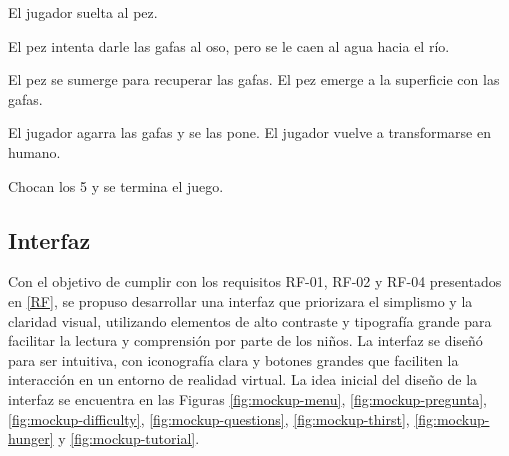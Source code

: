 \begin{play}

\begin{stage}
El jugador suelta al pez.
\end{stage}

\begin{stage}
El pez intenta darle las gafas al oso, pero se le caen al agua hacia el río.
\end{stage}




\begin{stage}
El pez se sumerge para recuperar las gafas.  
El pez emerge a la superficie con las gafas.
\end{stage}


\begin{stage}
El jugador agarra las gafas y se las pone.  
El jugador vuelve a transformarse en humano.
\end{stage}


\begin{stage}
Chocan los 5 y se termina el juego.
\end{stage}

\end{play}


\subsection{Interfaz}

Con el objetivo de cumplir con los requisitos RF-01, RF-02 y RF-04 presentados en \ref{RF}, se propuso desarrollar una interfaz que priorizara el simplismo y la claridad visual, utilizando elementos de alto contraste y tipografía grande para facilitar la lectura y comprensión por parte de los niños.
La interfaz se diseñó para ser intuitiva, con iconografía clara y botones grandes que faciliten la interacción en un entorno de realidad virtual. La idea inicial del diseño de la interfaz se encuentra en las Figuras \ref{fig:mockup-menu}, \ref{fig:mockup-pregunta}, \ref{fig:mockup-difficulty}, \ref{fig:mockup-questions}, \ref{fig:mockup-thirst}, \ref{fig:mockup-hunger} y \ref{fig:mockup-tutorial}.

